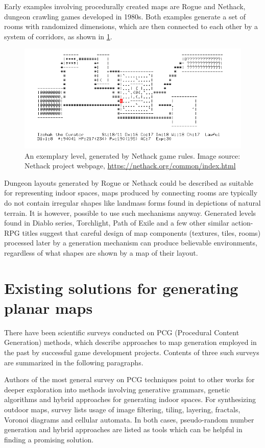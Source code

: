 \documentclass[12pt]{report}
\begin{document}
Early examples involving procedurally created maps are Rogue and Nethack, dungeon crawling games developed in 1980s. Both examples generate a set of rooms with randomized dimensions, which are then connected to each other by a system of corridors, as shown in \cref{fig:nethack}.
 

\begin{figure}[H]
	\centering
	\includegraphics[width=0.7\linewidth]{images/nethack}
	\caption{An exemplary level, generated by Nethack game rules. Image source: Nethack project webpage, \url{https://nethack.org/common/index.html}}
	\label{fig:nethack}
\end{figure}

Dungeon layouts generated by Rogue or Nethack could be described as suitable for representing indoor spaces, maps produced by connecting rooms are typically do not contain irregular shapes like landmass forms found in depictions of natural terrain. It is however, possible to use such mechanisms anyway. Generated levels found in Diablo series, Torchlight, Path of Exile and a few other similar action-RPG titles suggest that careful design of map components (textures, tiles, rooms) processed later by a generation mechanism can produce believable environments, regardless of what shapes are shown by a map of their layout. 
	

\section{Existing solutions for generating planar maps}

There have been scientific surveys conducted on PCG (Procedural Content Generation) methods, which describe approaches to map generation employed in the past by successful game development projects. Contents of three such surveys are summarized in the following paragraphs.

Authors of the most general survey on PCG techniques \autocite{hendrikx2013procedural} point to other works for deeper exploration into methods involving generative grammars, genetic algorithms and hybrid approaches for generating indoor spaces. For synthesizing outdoor maps, survey lists usage of image filtering, tiling, layering, fractals, Voronoi diagrams and cellular automata. In both cases, pseudo-random number generation and hybrid approaches are listed as tools which can be helpful in finding a promising solution. 
\end{document}
